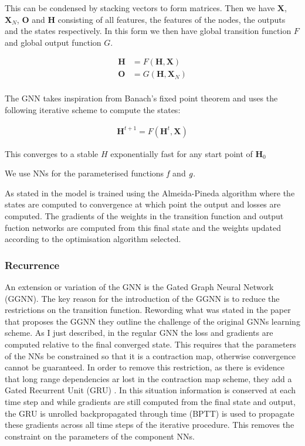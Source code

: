 \documentclass[]{../resources/final_report}
\begin{document}
This can be condensed by stacking vectors to form matrices. Then we have $\textbf{X}$, $\textbf{X}_N$, $\textbf{O}$ and $\textbf{H}$ 
consisting of all features, the features of the nodes, the outputs and the states respectively. In this form we then have global transition 
function $F$ and global output function $G$.

\begin{align}
  \textbf{H} &= F(\textbf{H}, \textbf{X})\\
  \textbf{O} &= G(\textbf{H}, \textbf{X}_N)\\
\end{align}

The GNN takes inspiration from Banach's fixed point theorem \cite{khamsi_kirk_2011} and uses the following iterative scheme to 
compute the states:

\begin{align}
  \textbf{H}^{t+1} = F(\textbf{H}^t, \textbf{X})
\end{align}

This converges to a stable $H$ exponentially fast for any start point of $\textbf{H}_0$

We use NNs for the parameterised functions $\emph{f}$ and $\emph{g}$.

As stated in \cite{GGNN} the model is trained using the Almeida-Pineda algorithm \cite{Almeida}\cite{Pineda} where 
the states are computed to convergence at which point the output and losses are computed. 
The gradients of the weights in the transition function and output fuction networks are computed from
this final state and the weights updated according to the optimisation algorithm selected.


\subsubsection{Recurrence}

An extension or variation of the GNN is the Gated Graph Neural Network (GGNN). The key reason for the introduction
of the GGNN is to reduce the restrictions on the transition function. Rewording what was stated in \cite{GGNN} the 
paper that proposes the GGNN they outline the challenge of the original GNNs learning scheme.
As I just described, in the regular GNN the loss and gradients are computed relative to the final converged state.
This requires that the parameters of the NNs be constrained so that it is a contraction map, otherwise convergence cannot be
guaranteed. In order to remove this restriction, as there is evidence that long range dependencies ar lost in the
contraction map scheme, they add a Gated Recurrent Unit (GRU) \cite{GRU}. In this situation
information is conserved at each time step and while gradients are still computed from the
final state and output, the GRU is unrolled backpropagated through time (BPTT) \cite{Pineda} is used to propagate these
gradients across all time steps of the iterative procedure. This removes the constraint on the parameters of the
component NNs.
\end{document}
